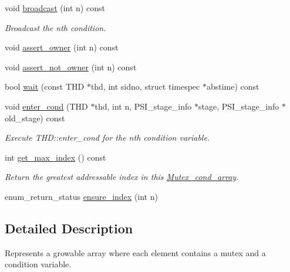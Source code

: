 \begin{DoxyCompactItemize}
void \mbox{\hyperlink{classMutex__cond__array_a814e7f07b28928ffe98a471581625775}{broadcast}} (int n) const
\begin{DoxyCompactList}\small\item\em Broadcast the n\textquotesingle{}th condition. \end{DoxyCompactList}\item 
void \mbox{\hyperlink{classMutex__cond__array_aae15c5c36f1d88f44f8ec8672a827d22}{assert\+\_\+owner}} (int n) const
\item 
void \mbox{\hyperlink{classMutex__cond__array_a944367c6618c3f1c766511fdfc10eff8}{assert\+\_\+not\+\_\+owner}} (int n) const
\item 
bool \mbox{\hyperlink{classMutex__cond__array_a3d35f8265bc0ba163ca0c6bb36ba96d9}{wait}} (const T\+HD $\ast$thd, int sidno, struct timespec $\ast$abstime) const
\item 
\mbox{\label{classMutex__cond__array_a21299141e0c3205b4ab6545621f9526e}} 
void \mbox{\hyperlink{classMutex__cond__array_a21299141e0c3205b4ab6545621f9526e}{enter\+\_\+cond}} (T\+HD $\ast$thd, int n, P\+S\+I\+\_\+stage\+\_\+info $\ast$stage, P\+S\+I\+\_\+stage\+\_\+info $\ast$old\+\_\+stage) const
\begin{DoxyCompactList}\small\item\em Execute T\+H\+D\+::enter\+\_\+cond for the n\textquotesingle{}th condition variable. \end{DoxyCompactList}\item 
\mbox{\label{classMutex__cond__array_a06799cb9027245967b4e372390a43514}} 
int \mbox{\hyperlink{classMutex__cond__array_a06799cb9027245967b4e372390a43514}{get\+\_\+max\+\_\+index}} () const
\begin{DoxyCompactList}\small\item\em Return the greatest addressable index in this \mbox{\hyperlink{classMutex__cond__array}{Mutex\+\_\+cond\+\_\+array}}. \end{DoxyCompactList}\item 
enum\+\_\+return\+\_\+status \mbox{\hyperlink{classMutex__cond__array_a36690cb3001e20bc5900abce919ea4e1}{ensure\+\_\+index}} (int n)
\end{DoxyCompactItemize}


\subsection{Detailed Description}
Represents a growable array where each element contains a mutex and a condition variable.

